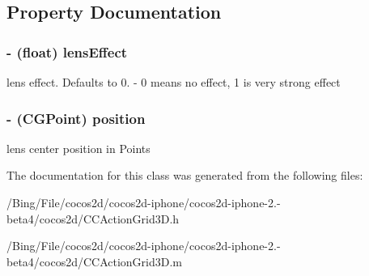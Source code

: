 \subsection{Property Documentation}
\hypertarget{interface_c_c_lens3_d_ab6e7fe6a6d007415eabafb1091750e9f}{
\subsubsection[{lens\-Effect}]{\setlength{\rightskip}{0pt plus 5cm}-\/ (float) {\bf lens\-Effect}}}\label{interface_c_c_lens3_d_ab6e7fe6a6d007415eabafb1091750e9f}
lens effect. Defaults to 0. -\/ 0 means no effect, 1 is very strong effect \hypertarget{interface_c_c_lens3_d_a2cc0045e4da4f80b39a529fb5ef6758e}{
\subsubsection[{position}]{\setlength{\rightskip}{0pt plus 5cm}-\/ (C\-G\-Point) {\bf position}}}\label{interface_c_c_lens3_d_a2cc0045e4da4f80b39a529fb5ef6758e}
lens center position in Points 

The documentation for this class was generated from the following files\-:\begin{DoxyCompactItemize}
\item 
/\-Bing/\-File/cocos2d/cocos2d-\/iphone/cocos2d-\/iphone-\/2.-\/beta4/cocos2d/C\-C\-Action\-Grid3\-D.\-h\item 
/\-Bing/\-File/cocos2d/cocos2d-\/iphone/cocos2d-\/iphone-\/2.-\/beta4/cocos2d/C\-C\-Action\-Grid3\-D.\-m\end{DoxyCompactItemize}

